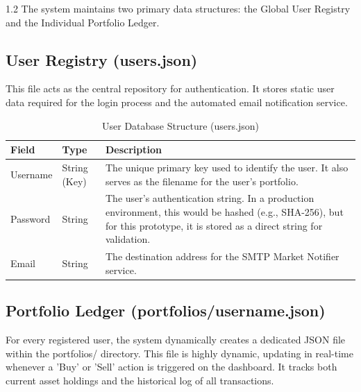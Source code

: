 \documentclass[12pt, a4paper]{report}
\begin{document}
\begin{spacing}{1.2}
The system maintains two primary data structures: the Global User Registry and the Individual Portfolio Ledger.

\subsection{User Registry (users.json)}
This file acts as the central repository for authentication. It stores static user data required for the login process and the automated email notification service.

\begin{table}[h]
    \centering
    \caption{User Database Structure (users.json)}
    \begin{tabular}{|p{3cm}|p{3cm}|p{8cm}|}
        \hline
        \textbf{Field} & \textbf{Type} & \textbf{Description} \\
        \hline
        Username & String (Key) & The unique primary key used to identify the user. It also serves as the filename for the user's portfolio. \\
        \hline
        Password & String & The user's authentication string. In a production environment, this would be hashed (e.g., SHA-256), but for this prototype, it is stored as a direct string for validation. \\
        \hline
        Email & String & The destination address for the SMTP Market Notifier service.\\
        \hline
    \end{tabular}
\end{table}

\subsection{Portfolio Ledger (portfolios/username.json)}
For every registered user, the system dynamically creates a dedicated JSON file within the portfolios/ directory. This file is highly dynamic, updating in real-time whenever a 'Buy' or 'Sell' action is triggered on the dashboard. It tracks both current asset holdings and the historical log of all transactions.


\end{spacing}
\end{document}
